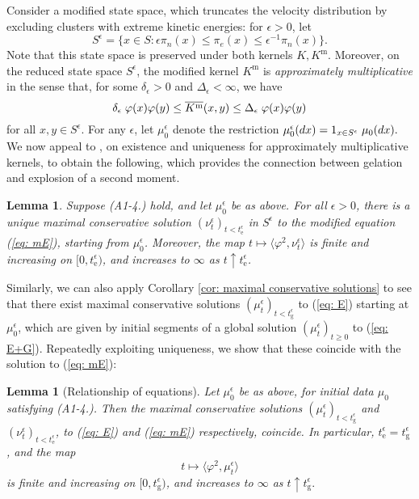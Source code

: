 \documentclass[11pt, notitlepage]{article}
\newtheorem{lem}[thm]{Lemma}
\begin{document}
Consider a modified state space, which truncates the velocity distribution by excluding clusters with extreme kinetic energies: for $\epsilon>0$, let \begin{equation}
    S^\epsilon= \{x\in S: \epsilon \pi_n(x) \leq \pi_e(x) \leq \epsilon^{-1} \pi_n(x)\}.
\end{equation} Note that this state space is preserved under both kernels $K, K^\mathrm{m}$. Moreover, on the reduced state space $S^\epsilon$, the modified kernel $K^\mathrm{m}$ is \emph{approximately multiplicative} \cite{N00} in the sense that, for some $\delta_\epsilon>0$ and $\Delta_\epsilon<\infty$, we have \begin{equation}
    \delta_\epsilon\hspace{0.1cm}\varphi(x)\varphi(y) \leq \overline{K^\mathrm{m}}(x,y) \leq  \Delta_\epsilon\hspace{0.1cm}\varphi(x)\varphi(y)
\end{equation}for all $x,y \in S^\epsilon$. For any $\epsilon$, let $\mu_0^\epsilon$ denote the restriction $\mu_0^\epsilon(dx)=1_{x\in S^\epsilon}\hspace{0.1cm}\mu_0(dx).$ We now appeal to \cite[Theorem 2.2]{N00}, on existence and uniqueness for approximately multiplicative kernels, to obtain the following, which provides the connection between gelation and explosion of a second moment.
\begin{lem}\label{lemma: solution to modified equation}
    Suppose (A1-4.) hold, and let $\mu^\epsilon_0$ be as above. For all $\epsilon>0$, there is a unique maximal conservative solution  $(\nu^\epsilon_t)_{t< t_\mathrm{e}^\epsilon}$ in $S^\epsilon$ to the modified equation (\ref{eq: mE}), starting from $\mu_0^\epsilon$. Moreover, the map $t\mapsto \langle \varphi^2, \nu^\epsilon_t\rangle$ is finite and increasing on $[0,t_\mathrm{e}^\epsilon)$, and increases to $\infty$ as $t\uparrow t_\mathrm{e}^\epsilon$. 
\end{lem}

Similarly, we can also apply Corollary \ref{cor: maximal conservative solutions} to see that there exist maximal conservative solutions $(\mu^\epsilon_t)_{t<t_\mathrm{g}^\epsilon}$ to (\ref{eq: E}) starting at $\mu^\epsilon_0$, which are given by initial segments of a global solution $(\mu^\epsilon_t)_{t\geq 0}$ to (\ref{eq: E+G}). Repeatedly exploiting uniqueness, we show that these coincide with the solution to (\ref{eq: mE}):

\begin{lem}[Relationship of equations]\label{lemma: Relationship}
Let $\mu^\epsilon_0$ be as above, for initial data $\mu_0$ satisfying ({A1}-4.).  Then the maximal conservative solutions $(\mu^\epsilon_t)_{t<t_\mathrm{g}^\epsilon}$ and $(\nu^\epsilon_t)_{t<t_\mathrm{e}^\epsilon}$, to (\ref{eq: E}) and (\ref{eq: mE}) respectively, coincide. In particular, $t_\mathrm{e}^\epsilon = t^\epsilon_\mathrm{g}$, and the map \begin{equation}
    t\mapsto \langle \varphi^2, \mu^\epsilon_t\rangle
\end{equation} is finite and increasing on $[0, t_\mathrm{g}^\epsilon)$, and increases to $\infty$ as $t\uparrow t_\mathrm{g}^\epsilon.$ \end{lem}
\end{document}
